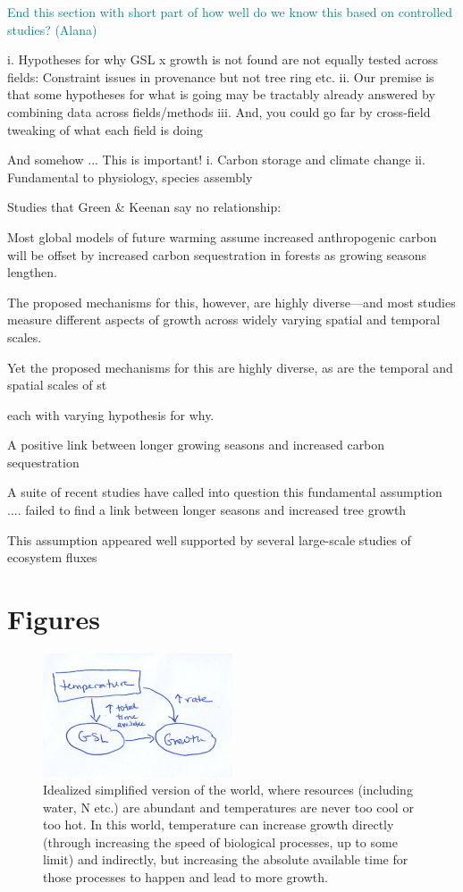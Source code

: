 \documentclass[11pt]{article}
\begin{document}
\textcolor{teal}{End this section with short part of how well do we know this based on controlled studies? (Alana)}

i. Hypotheses for why GSL x growth is not found are not equally tested across fields: Constraint issues in provenance but not tree ring etc.
ii. Our premise is that some hypotheses for what is going may be tractably already answered by combining data across fields/methods
iii. And, you could go far by cross-field tweaking of what each field is doing

And somehow ... This is important!
i. Carbon storage and climate change
ii. Fundamental to physiology, species assembly

Studies that Green \& Keenan say no relationship:

Most global models of future warming assume increased anthropogenic carbon will be offset by increased carbon sequestration in forests as growing seasons lengthen.

The proposed mechanisms for this, however, are highly diverse---and most studies measure different aspects of growth across widely varying spatial and temporal scales. 

Yet the proposed mechanisms for this are highly diverse, as are the temporal and spatial scales of st


each with varying hypothesis for why. 

A positive link between longer growing seasons and increased carbon sequestration 

A suite of recent studies have called into question this fundamental assumption .... failed to find a link between longer seasons and increased tree growth

This assumption appeared well supported by several large-scale studies of ecosystem fluxes 


\section{Figures}
\newpage
\begin{figure}[h!]
\includegraphics[width=0.5\textwidth]{..//figures/gsltogrowth/gsltogrowth_emw1a.png}
\caption{Idealized simplified version of the world, where resources (including water, N etc.) are abundant and temperatures are never too cool or too hot. In this world, temperature can increase growth directly (through increasing the speed of biological processes, up to some limit) and indirectly, but increasing the absolute available time for those processes to happen and lead to more growth.}
\label{fig:concepbiotime}
\end{figure}
\end{document}
